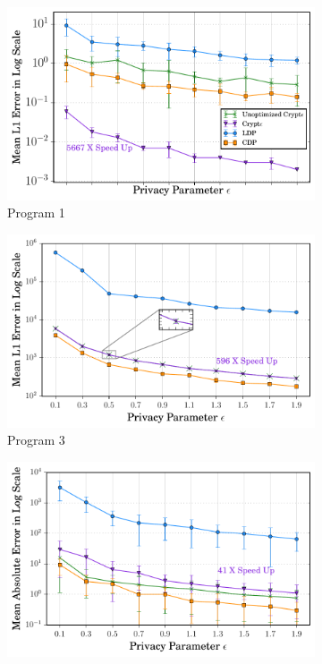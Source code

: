 \begin{figure}[ht]

    \begin{subfigure}[b]{0.25\linewidth}
        \centering
         \includegraphics[width=1\linewidth]{8_final.pdf}
        \caption{ Program 1}
        \label{fig:P1}
    \end{subfigure}%
    \begin{subfigure}[b]{0.25\linewidth}
    \centering \includegraphics[width=1\linewidth]{3_final.pdf}
        \caption{Program 3}
        \label{fig:P3}\end{subfigure}%
    \begin{subfigure}[b]{0.25\linewidth}
    \centering    \includegraphics[width=1\linewidth]{5_final.pdf}

\end{subfigure}
\end{figure}
